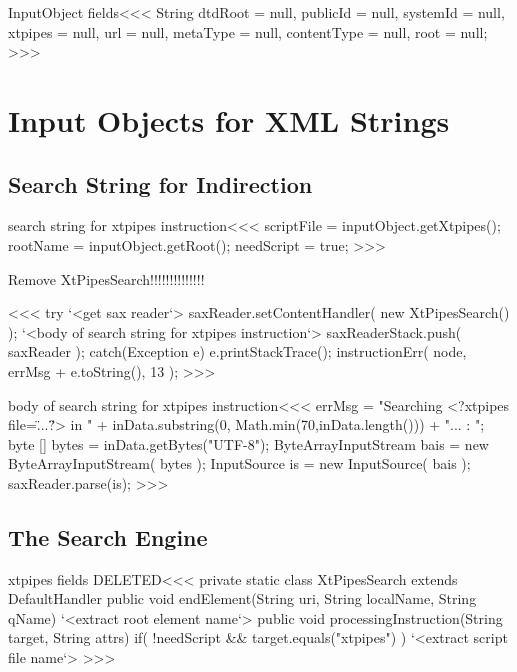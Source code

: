 \documentclass{article}
\begin{document}
\<InputObject fields\><<<
String dtdRoot = null,
      publicId = null,
      systemId = null,
       xtpipes = null,
           url = null,
      metaType = null,
   contentType = null,
          root = null;
>>>



\section{Input Objects for XML Strings}



\subsection{Search String for Indirection}


\<search string for xtpipes instruction\><<<
scriptFile = inputObject.getXtpipes();
rootName = inputObject.getRoot();
needScript = true;
>>>


Remove XtPipesSearch!!!!!!!!!!!!!!

\<\><<<
try{ 
       `<get sax reader`>      
       saxReader.setContentHandler( new XtPipesSearch() );
      `<body of search string for xtpipes instruction`>
       saxReaderStack.push( saxReader );   
} catch(Exception e){   
e.printStackTrace();
   instructionErr( node, errMsg + e.toString(), 13 );   
}
>>>

\<body of search string for xtpipes instruction\><<<
errMsg = "Searching <?xtpipes file=\"...\"?>  in "
        + inData.substring(0, Math.min(70,inData.length()))
        + "... : ";
byte [] bytes = inData.getBytes("UTF-8");
ByteArrayInputStream bais = new ByteArrayInputStream( bytes );
InputSource is = new InputSource( bais );
saxReader.parse(is);
>>>

\subsection{The Search Engine}



\<xtpipes fields DELETED\><<<
private static class XtPipesSearch extends DefaultHandler {
   public void  endElement(String uri, 
                           String localName, String qName){
     `<extract root element name`>
   }
   public void processingInstruction(String target, String attrs) {
     if( !needScript && target.equals("xtpipes") ){
        `<extract script file name`>
}  } }
>>>
\end{document}
